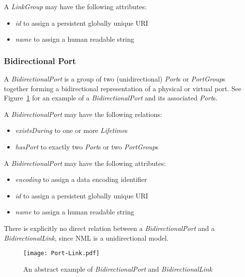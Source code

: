 A \emph{LinkGroup} may have the following attributes:
\begin{itemize}
    \item \emph{id} to assign a persistent globally unique URI
    \item \emph{name} to assign a human readable string
\end{itemize}



\subsubsection{Bidirectional Port}%
\label{class:bidirectional_port}

A \emph{BidirectionalPort} is a group of two (unidirectional) 
\emph{Port}s or \emph{PortGroup}s together forming a bidirectional representation of a physical or 
virtual port. See Figure~\ref{fig:Port-Link} for an example of a \emph{BidirectionalPort} and its associated \emph{Port}s.

A \emph{BidirectionalPort} may have the following relations:
\begin{itemize}
    \item \emph{existsDuring} to one or more \emph{Lifetime}s
    \item \emph{hasPort} to exactly two \emph{Port}s or two \emph{PortGroup}s
\end{itemize}

A \emph{BidirectionalPort} may have the following attributes:
\begin{itemize}
    \item \emph{encoding} to assign a data encoding identifier
    \item \emph{id} to assign a persistent globally unique URI
    \item \emph{name} to assign a human readable string
\end{itemize}

There is explicitly no direct relation between a \emph{BidirectionalPort} and a \emph{BidirectionalLink}, since NML is a unidirectional model.

\begin{figure}[htbp]
    \centering
        \texttt{[image: Port-Link.pdf]}
    \caption{An abstract example of \emph{BidirectionalPort} and \emph{BidirectionalLink}}
    \label{fig:Port-Link}
\end{figure}


